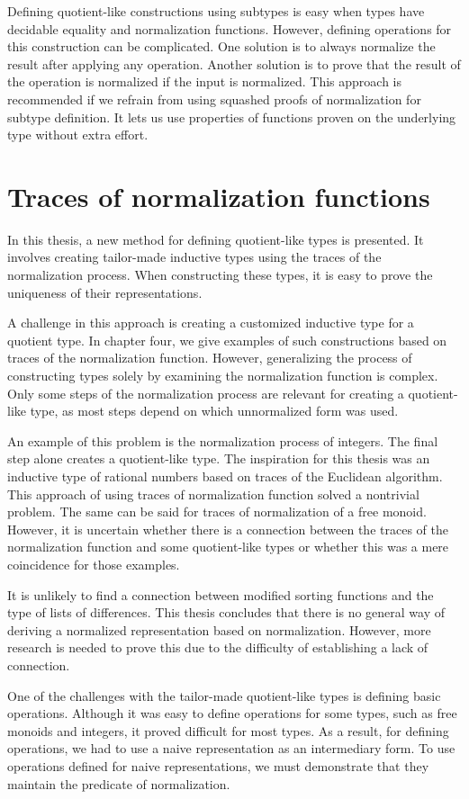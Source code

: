 Defining quotient-like constructions using subtypes is easy when types have decidable equality and normalization functions. However, defining operations for this construction can be complicated. One solution is to always normalize the result after applying any operation. Another solution is to prove that the result of the operation is normalized if the input is normalized. This approach is recommended if we refrain from using squashed proofs of normalization for subtype definition. It lets us use properties of functions proven on the underlying type without extra effort.
\section{Traces of normalization functions}
In this thesis, a new method for defining quotient-like types is presented. It involves creating tailor-made inductive types using the traces of the normalization process. When constructing these types, it is easy to prove the uniqueness of their representations.

A challenge in this approach is creating a customized inductive type for a quotient type. In chapter four, we give examples of such constructions based on traces of the normalization function. However, generalizing the process of constructing types solely by examining the normalization function is complex. Only some steps of the normalization process are relevant for creating a quotient-like type, as most steps depend on which unnormalized form was used.

An example of this problem is the normalization process of integers. The final step alone creates a quotient-like type. The inspiration for this thesis was an inductive type of rational numbers based on traces of the Euclidean algorithm. This approach of using traces of normalization function solved a nontrivial problem. The same can be said for traces of normalization of a free monoid. However, it is uncertain whether there is a connection between the traces of the normalization function and some quotient-like types or whether this was a mere coincidence for those examples.

It is unlikely to find a connection between modified sorting functions and the type of lists of differences. This thesis concludes that there is no general way of deriving a normalized representation based on normalization. However, more research is needed to prove this due to the difficulty of establishing a lack of connection.

One of the challenges with the tailor-made quotient-like types is defining basic operations. Although it was easy to define operations for some types, such as free monoids and integers, it proved difficult for most types. As a result, for defining operations, we had to use a naive representation as an intermediary form. To use operations defined for naive representations, we must demonstrate that they maintain the predicate of normalization.

